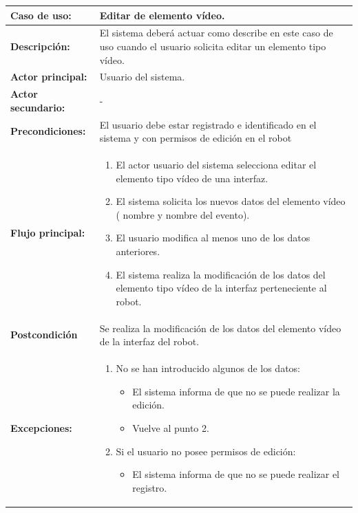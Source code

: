 \begin{table}[H]
  \begin{center}
    \begin{tabular}{|p{3.5cm}|p{10cm}|}
      \hline
      {\textbf{Caso de uso:}} & { Editar de elemento vídeo.} \\
      \hline
      {\textbf{Descripción:}} & { El sistema deberá actuar como describe en este caso de uso cuando el usuario solicita editar un elemento tipo vídeo.} \\
     \hline
      {\textbf{Actor principal:}} & { Usuario del sistema.} \\
      \hline
      {\textbf{Actor secundario:}} & { - } \\
      \hline
      {\textbf{Precondiciones:}} & { El usuario debe estar registrado e identificado en el sistema y con permisos de edición en el robot} \\
     \hline   
    {\textbf{Flujo principal:}} & { 
      \begin{enumerate}
	\item El actor usuario del sistema selecciona editar el elemento tipo vídeo de una interfaz.
	\item El sistema solicita los nuevos datos del elemento vídeo ( nombre y nombre del evento).
	\item El usuario modifica al menos uno de los datos anteriores.
	\item El sistema realiza la modificación de los datos del elemento tipo vídeo de la interfaz perteneciente al robot.
      \end{enumerate}
      } \\
     \hline
     {\textbf{Postcondición}} & {Se realiza la modificación de los datos del elemento vídeo de la interfaz del robot.}\\
     \hline
      {\textbf{Excepciones:}} & {
	\begin{enumerate}
	\item No se han introducido algunos de los datos:
	\begin{itemize}
	  \item El sistema informa de que no se puede realizar la edición.
	  \item Vuelve al punto 2.
	\end{itemize}
	\item Si el usuario no posee permisos de edición:
	  \begin{itemize}
	    \item El sistema informa de que no se puede realizar el registro.

\end{itemize}
\end{enumerate}}
\end{tabular}
\end{center}
\end{table}
